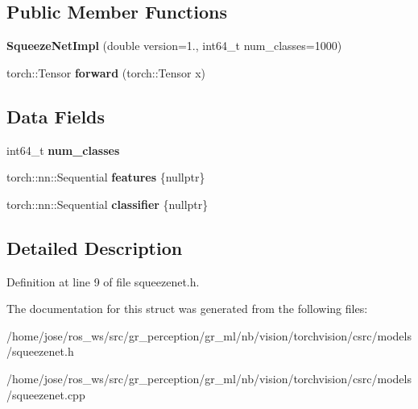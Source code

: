 \subsection*{Public Member Functions}
\begin{DoxyCompactItemize}
\item 
\mbox{\label{structvision_1_1models_1_1SqueezeNetImpl_a171a84504d712e9c2528578225e14032}} 
{\bfseries Squeeze\+Net\+Impl} (double version=1., int64\+\_\+t num\+\_\+classes=1000)
\item 
\mbox{\label{structvision_1_1models_1_1SqueezeNetImpl_ac5cf080913618ff826d465fb8de7aa61}} 
torch\+::\+Tensor {\bfseries forward} (torch\+::\+Tensor x)
\end{DoxyCompactItemize}
\subsection*{Data Fields}
\begin{DoxyCompactItemize}
\item 
\mbox{\label{structvision_1_1models_1_1SqueezeNetImpl_ae1c1c2db0fe64766d201d38daff14963}} 
int64\+\_\+t {\bfseries num\+\_\+classes}
\item 
\mbox{\label{structvision_1_1models_1_1SqueezeNetImpl_ab2e600114de1c55ec371bf4850b04c79}} 
torch\+::nn\+::\+Sequential {\bfseries features} \{nullptr\}
\item 
\mbox{\label{structvision_1_1models_1_1SqueezeNetImpl_a2794b7a21ce3043aadaff25aa0210241}} 
torch\+::nn\+::\+Sequential {\bfseries classifier} \{nullptr\}
\end{DoxyCompactItemize}


\subsection{Detailed Description}


Definition at line 9 of file squeezenet.\+h.



The documentation for this struct was generated from the following files\+:\begin{DoxyCompactItemize}
\item 
/home/jose/ros\+\_\+ws/src/gr\+\_\+perception/gr\+\_\+ml/nb/vision/torchvision/csrc/models/squeezenet.\+h\item 
/home/jose/ros\+\_\+ws/src/gr\+\_\+perception/gr\+\_\+ml/nb/vision/torchvision/csrc/models/squeezenet.\+cpp\end{DoxyCompactItemize}
